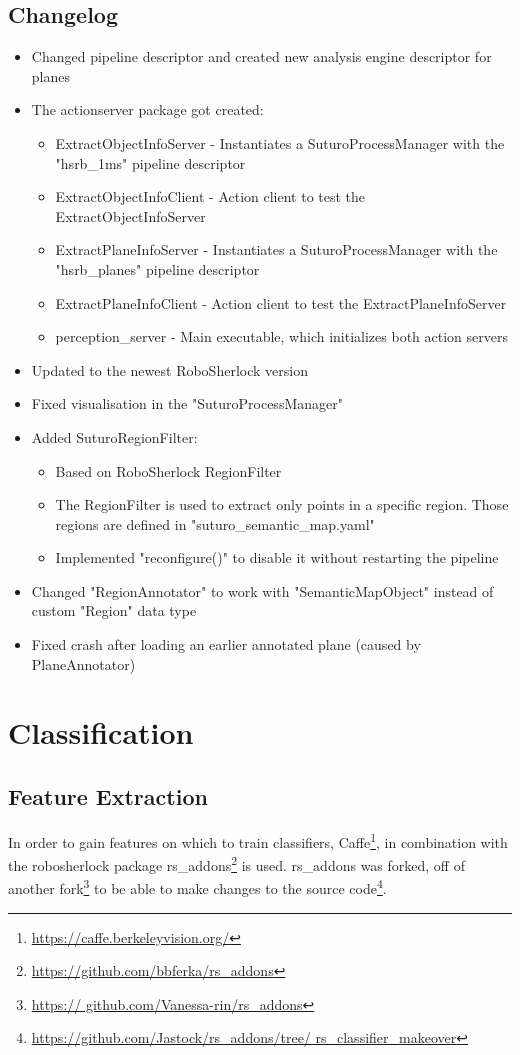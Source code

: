 \documentclass[main.tex]{subfiles}
\begin{document}
			\subsection{Changelog}
			\begin{itemize}
			\item Changed pipeline descriptor and created new analysis engine descriptor for planes
			\item The actionserver package got created:
				\begin{itemize}
				\item ExtractObjectInfoServer - Instantiates a SuturoProcessManager with the "hsrb\_1ms" pipeline descriptor
				\item ExtractObjectInfoClient - Action client to test the ExtractObjectInfoServer
				\item ExtractPlaneInfoServer - Instantiates a SuturoProcessManager with the "hsrb\_planes" pipeline descriptor
				\item ExtractPlaneInfoClient - Action client to test the ExtractPlaneInfoServer
				\item perception\_server - Main executable, which initializes both action servers
				\end{itemize}
			\item Updated to the newest RoboSherlock version
			\item Fixed visualisation in the "SuturoProcessManager"
			\item Added SuturoRegionFilter:
				\begin{itemize}
				\item Based on RoboSherlock RegionFilter
				\item The RegionFilter is used to extract only points in a specific region. Those regions are defined in "suturo\_semantic\_map.yaml"
				\item Implemented "reconfigure()" to disable it without restarting the pipeline
				\end{itemize}
			\item Changed "RegionAnnotator" to work with "SemanticMapObject" instead of custom "Region" data type
			\item Fixed crash after loading an earlier annotated plane (caused by PlaneAnnotator)
			\end{itemize}

		\section{Classification}
		    \subsection{Feature Extraction}
		    In order to gain features on which to train classifiers, Caffe\footnote{\url{https://caffe.berkeleyvision.org/}}, in combination with the robosherlock 				package rs\_addons\footnote{\url{https://github.com/bbferka/rs_addons}} is used. rs\_addons was forked, off of another fork\footnote{\url{https://					github.com/Vanessa-rin/rs_addons}} to be able to make changes to the source code\footnote{\url{https://github.com/Jastock/rs_addons/tree/								rs_classifier_makeover}}.\\
		    
\end{document}
